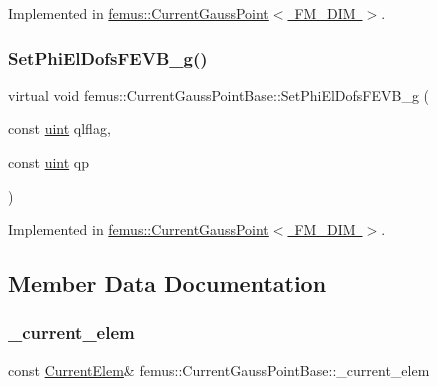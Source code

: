 Implemented in \mbox{\hyperlink{classfemus_1_1_current_gauss_point_af33ae0e6b36353be0bb671573c6362bc}{femus\+::\+Current\+Gauss\+Point$<$ F\+M\+\_\+\+D\+I\+M $>$}}.

\mbox{\label{classfemus_1_1_current_gauss_point_base_aec970c4eef875b43169cb74674276e29}} 
\subsubsection{\texorpdfstring{Set\+Phi\+El\+Dofs\+F\+E\+V\+B\+\_\+g()}{SetPhiElDofsFEVB\_g()}}
{\footnotesize\ttfamily virtual void femus\+::\+Current\+Gauss\+Point\+Base\+::\+Set\+Phi\+El\+Dofs\+F\+E\+V\+B\+\_\+g (\begin{DoxyParamCaption}\item[{const \mbox{\hyperlink{_typedefs_8hpp_a91ad9478d81a7aaf2593e8d9c3d06a14}{uint}}}]{qlflag,  }\item[{const \mbox{\hyperlink{_typedefs_8hpp_a91ad9478d81a7aaf2593e8d9c3d06a14}{uint}}}]{qp }\end{DoxyParamCaption})\hspace{0.3cm}{\ttfamily [pure virtual]}}



Implemented in \mbox{\hyperlink{classfemus_1_1_current_gauss_point_a7a11e1164802fdc683726eea6123d99f}{femus\+::\+Current\+Gauss\+Point$<$ F\+M\+\_\+\+D\+I\+M $>$}}.



\subsection{Member Data Documentation}
\mbox{\label{classfemus_1_1_current_gauss_point_base_a8e74a49e2a79f39e0e38b22c2c17f893}} 
\subsubsection{\texorpdfstring{\+\_\+current\+\_\+elem}{\_current\_elem}}
{\footnotesize\ttfamily const \mbox{\hyperlink{classfemus_1_1_current_elem}{Current\+Elem}}\& femus\+::\+Current\+Gauss\+Point\+Base\+::\+\_\+current\+\_\+elem\hspace{0.3cm}{\ttfamily [protected]}}

